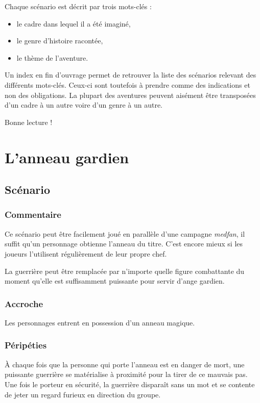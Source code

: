 \documentclass[a5paper,pagesize,10pt,bibtotoc,pointlessnumbers,
normalheadings,DIV=9,twoside=false]{scrbook}
\begin{document}
Chaque scénario est décrit par trois mots-clés :
\begin{itemize}
	\item le cadre dans lequel il a été imaginé,
	\item le genre d'histoire racontée,
	\item le thème de l'aventure.
\end{itemize}

Un index en fin d'ouvrage permet de retrouver la liste des scénarios relevant des différents mots-clés.
Ceux-ci sont toutefois à prendre comme des indications et non des obligations.
La plupart des aventures peuvent aisément être transposées d'un cadre à un autre voire d'un genre à un autre.

Bonne lecture !

\chapter{L'anneau gardien}

\section{Scénario}

\subsection*{Commentaire}

Ce scénario peut être facilement joué en parallèle d'une campagne \emph{medfan}, il suffit qu'un personnage obtienne l'anneau du titre.
C'est encore mieux si les joueurs l'utilisent régulièrement de leur propre chef.

La guerrière peut être remplacée par n'importe quelle figure combattante du moment qu'elle est suffisamment puissante pour servir d'ange gardien.

\subsection*{Accroche}

Les personnages entrent en possession d'un anneau magique.

\subsection*{Péripéties}

À chaque fois que la personne qui porte l'anneau est en danger de mort, une puissante guerrière se matérialise à proximité pour la tirer de ce mauvais pas.
Une fois le porteur en sécurité, la guerrière disparaît sans un mot et se contente de jeter un regard furieux en direction du groupe.
\end{document}
